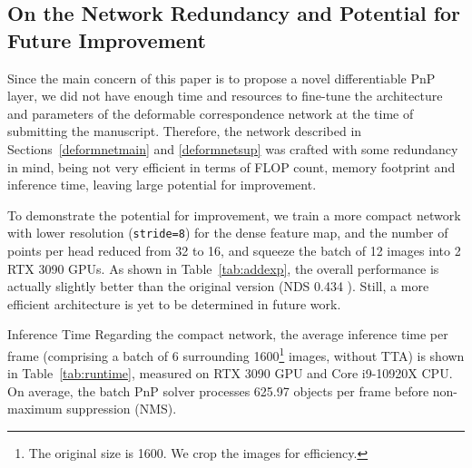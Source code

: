 \documentclass[10pt,twocolumn,letterpaper]{article}
\makeatletter
\renewcommand{\paragraph}{
  \@startsection{paragraph}{4}
  {\z@}{1.0ex \@plus 0ex \@minus .3ex}{-1em}
  {\normalfont\normalsize\bfseries}
}
\makeatother
\begin{document}
\subsection{On the Network Redundancy and Potential for Future Improvement}
Since the main concern of this paper is to propose a novel differentiable PnP layer, we did not have enough time and resources to fine-tune the architecture and parameters of the deformable correspondence network at the time of submitting the manuscript. Therefore, the network described in Sections~\ref{deformnetmain} and \ref{deformnetsup} was crafted with some redundancy in mind, being not very efficient in terms of FLOP count, memory footprint and inference time, leaving large potential for improvement.



To demonstrate the potential for improvement, we train a more compact network with lower resolution (\texttt{stride=8}) for the dense feature map, and the number of points per head  reduced from 32 to 16, and squeeze the batch of 12 images into 2 RTX 3090 GPUs. As shown in Table~\ref{tab:addexp}, the overall performance is actually slightly better than the original version (NDS 0.434 ). Still, a more efficient architecture is yet to be determined in future work.

\paragraph{Inference Time}
Regarding the compact network, the average inference time per frame (comprising a batch of 6 surrounding 1600\footnote{The original size is 1600. We crop the images for efficiency.} images, without TTA) is shown in Table~\ref{tab:runtime}, measured on RTX 3090 GPU and Core i9-10920X CPU. On average, the batch PnP solver processes 625.97 objects per frame before non-maximum suppression (NMS).
\end{document}
